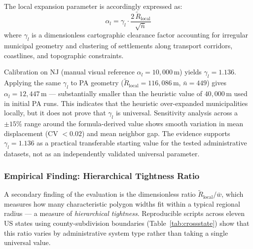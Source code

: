 \documentclass[12pt, a4paper]{article}
\numberwithin{equation}{section}
\begin{document}
The local expansion parameter is accordingly expressed as:
\begin{equation}
  \boxed{\alpha_l = \gamma_l \cdot \frac{2\,\widetilde{R}_{\text{local}}}{\sqrt{\bar{n}}}}
  \label{eq:alpha_l_derived}
\end{equation}
where $\gamma_l$ is a dimensionless cartographic clearance factor accounting for irregular municipal geometry and clustering of settlements along transport corridors, coastlines, and topographic constraints.

Calibration on NJ (manual visual reference $\alpha_l = 10{,}000$\,m) yields $\gamma_l = 1.136$. Applying the same $\gamma_l$ to PA geometry ($\widetilde{R}_{\text{local}} = 116{,}086$\,m, $\bar{n} = 449$) gives $\alpha_l = 12{,}447$\,m --- substantially smaller than the heuristic value of $40{,}000$\,m used in initial PA runs. This indicates that the heuristic over-expanded municipalities locally, but it does not prove that $\gamma_l$ is universal. Sensitivity analysis across a $\pm 15\%$ range around the formula-derived value shows smooth variation in mean displacement (CV $< 0.02$) and mean neighbor gap. The evidence supports $\gamma_l = 1.136$ as a practical transferable starting value for the tested administrative datasets, not as an independently validated universal parameter.

\subsubsection{Empirical Finding: Hierarchical Tightness Ratio}
\label{sec:ratio}

A secondary finding of the evaluation is the dimensionless ratio $\widetilde{R}_{\text{local}}/\bar{w}$, which measures how many characteristic polygon widths fit within a typical regional radius --- a measure of \emph{hierarchical tightness}. Reproducible scripts across eleven US states using county-subdivision boundaries (Table~\ref{tab:crossstate}) show that this ratio varies by administrative system type rather than taking a single universal value.
\end{document}
